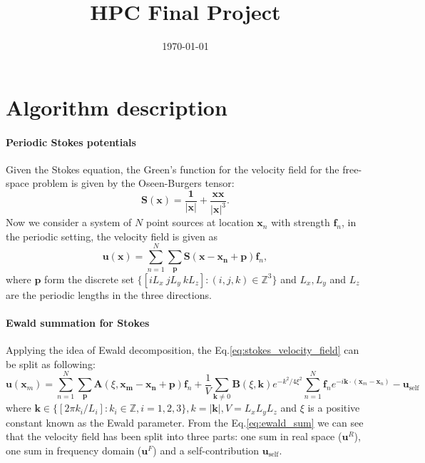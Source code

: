 \documentclass{article}[12pt]
\begin{document}
\title{HPC Final Project}

\date{\today}

\maketitle

\section{Algorithm description}

\paragraph{Periodic Stokes potentials}
Given the Stokes equation, the Green's function for the velocity field for the free-space problem is given by the Oseen-Burgers tensor:
\begin{equation}
\mathbf{S}(\mathbf{x}) = \frac{\mathbf{1}}{|\mathbf{x}|} + \frac{\mathbf{x x}}{|\mathbf{x}|^3}.
\end{equation}
Now we consider a system of $N$ point sources at location $\mathbf{x}_n$ with strength $\mathbf{f}_n$, in the periodic setting, the velocity field is given as
\begin{equation}
\mathbf{u}(\mathbf{x}) = \sum_{n=1}^{N} \sum_{\mathbf{p}} \mathbf{S}(\mathbf{x - x_n + p}) \mathbf{f}_n, \label{eq:stokes_velocity_field}
\end{equation}     
where $\mathbf{p}$ form the discrete set $\{[iL_x \ jL_y \  kL_z]:(i, j, k) \in \mathbb{Z}^3\}$ and $L_x, L_y$ and $L_z$ are the periodic lengths in the three directions.

\paragraph{Ewald summation for Stokes}
Applying the idea of Ewald decomposition, the Eq.\eqref{eq:stokes_velocity_field} can be split as following:
\begin{equation}
\mathbf{u}(\mathbf{x}_m) = \sum_{n=1}^{N} \sum_{\mathbf{p}} \mathbf{A}(\xi, \mathbf{x_m - x_n + p}) \mathbf{f}_n + \frac{1}{V} \sum_{\mathbf{k} \neq 0} \mathbf{B}(\xi, \mathbf{k}) e^{-k^2/4\xi^2}\sum_{n=1}^{N} \mathbf{f}_n e ^{-i \mathbf{k} \cdot (\mathbf{x}_m - \mathbf{x}_n)} - \mathbf{u}_{\text{self}} \label{eq:ewald_sum}
\end{equation} 
where $\mathbf{k} \in \{[2 \pi k_i / L_i]: k_i \in \mathbb{Z}, i=1,2,3\}, k = |\mathbf{k}|, V=L_x L_y L_z$ and $\xi$ is a positive constant known as the Ewald parameter. From the Eq.\eqref{eq:ewald_sum} we can see that the velocity field has been split into three parts: one sum in real space ($\mathbf{u}^R$), one sum in frequency domain ($\mathbf{u}^F$) and a self-contribution $\mathbf{u}_{\text{self}}$.
\end{document}
